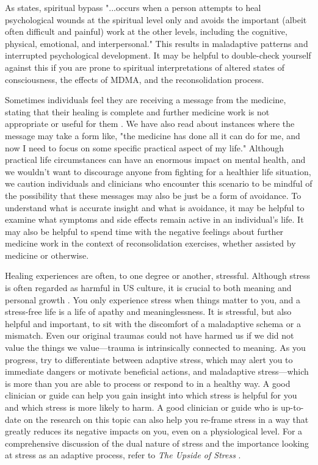 \documentclass[12pt,letterpaper]{book}
\begin{document}
As \textcite{cashwell2007Bypass} states, spiritual bypass "...occurs when a person attempts to heal psychological wounds at the spiritual level only and avoids the important (albeit often difficult and painful) work at the other levels, including the cognitive, physical, emotional, and interpersonal." This results in maladaptive patterns and interrupted psychological development. It may be helpful to double-check yourself against this if you are prone to spiritual interpretations of altered states of consciousness, the effects of MDMA, and the reconsolidation process.

Sometimes individuals feel they are receiving a message from the medicine, stating that their healing is complete and further medicine work is not appropriate or useful for them \cite{razviDissociation}. We have also read about instances where the message may take a form like, "the medicine has done all it can do for me, and now I need to focus on some specific practical aspect of my life." Although practical life circumstances can have an enormous impact on mental health, and we wouldn't want to discourage anyone from fighting for a healthier life situation, we caution individuals and clinicians who encounter this scenario to be mindful of the possibility that these messages may also be just be a form of avoidance. To understand what is accurate insight and what is avoidance, it may be helpful to examine what symptoms and side effects remain active in an individual's life. It may also be helpful to spend time with the negative feelings about further medicine work in the context of reconsolidation exercises, whether assisted by medicine or otherwise.

Healing experiences are often, to one degree or another, stressful. Although stress is often regarded as harmful in US culture, it is crucial to both meaning and personal growth \cite{mcgonigalStress}. You only experience stress when things matter to you, and a stress-free life is a life of apathy and meaninglessness. It is stressful, but also helpful and important, to sit with the discomfort of a maladaptive schema or a mismatch. Even our original traumas could not have harmed us if we did not value the things we value—trauma is intrinsically connected to meaning. As you progress, try to differentiate between adaptive stress, which may alert you to immediate dangers or motivate beneficial actions, and maladaptive stress—which is more than you are able to process or respond to in a healthy way. A good clinician or guide can help you gain insight into which stress is helpful for you and which stress is more likely to harm. A good clinician or guide who is up-to-date on the research on this topic can also help you re-frame stress in a way that greatly reduces its negative impacts on you, even on a physiological level. For a comprehensive discussion of the dual nature of stress and the importance looking at stress as an adaptive process, refer to \textit{The Upside of Stress} \cite{mcgonigalStress}.
\end{document}
